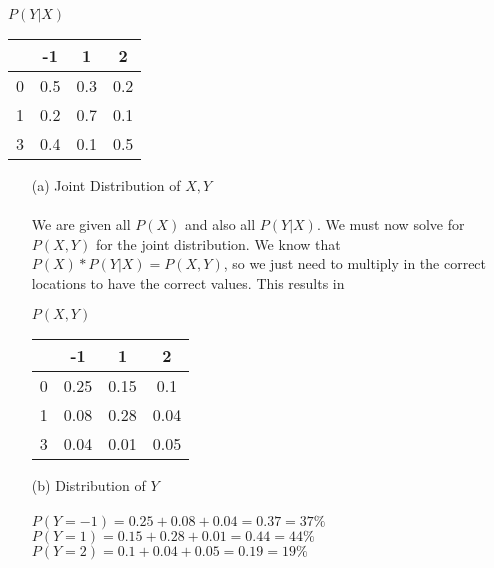 \documentclass[11pt]{article}
\begin{document}
\begin{center}
{\Large \textbf{$P(Y | X)$}}\\ 
  \begin{tabular}{ r || c | c | c |}
	 & -1 & 1 & 2 \\ \hline
	 0 & 0.5 & 0.3 & 0.2\\ \hline   
    1 & 0.2 & 0.7 & 0.1 \\ \hline
    3 & 0.4 & 0.1 & 0.5 \\ \hline
    \hline
  \end{tabular}
\end{center}
\begin{enumerate}
\item[(a)] Joint Distribution of $X, Y$\\ \\
We are given all $P(X)$ and also all $P(Y | X)$.  We must now solve for $P(X, Y)$ for the joint distribution.  We know that $P(X) * P(Y | X) = P(X, Y)$, so we just need to multiply in the correct locations to have the correct values.  This results in \\
\begin{center}
{\Large \textbf{$P(X, Y)$}}\\ 
  \begin{tabular}{ r || c | c | c |}
	 & -1 & 1 & 2 \\ \hline
	 0 & 0.25 & 0.15 & 0.1\\ \hline   
    1 & 0.08 & 0.28 & 0.04 \\ \hline
    3 & 0.04 & 0.01 & 0.05 \\ \hline
    \hline
  \end{tabular}
\end{center}

\item[(b)] Distribution of $Y$
\\
\\
{\Large 
$P(Y = -1) = 0.25 + 0.08 + 0.04 = 0.37 = 37\%$\\
$P(Y = 1) = 0.15 + 0.28 + 0.01 = 0.44 = 44\%$\\
$P(Y = 2) = 0.1 + 0.04 + 0.05 = 0.19 = 19\%$\\
}


\end{enumerate}
\end{document}
